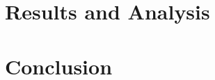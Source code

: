 \documentclass[11pt,twocolumn]{article}
\begin{document}

\section{Results and Analysis}

\section{Conclusion}




\end{document}
